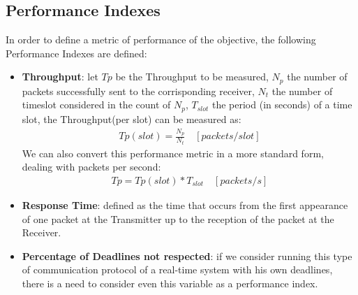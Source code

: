 \subsection{Performance Indexes}
In order to define a metric of performance of the objective, the following Performance Indexes are defined:
\begin{itemize}
	\item \textbf{Throughput}: let $Tp$ be the Throughput to be measured, $N_{p}$ the number of packets successfully sent to the corrisponding receiver, $N_{t}$ the number of timeslot considered in the count of $N_{p}$, $T_{slot}$ the period (in seconds) of a time slot, the Throughput(per slot) can be measured as:
	\begin{align*}
	Tp(slot) = \frac{N_{p}}{N_{t}} \quad [packets/slot]
	\end{align*}
	We can also convert this performance metric in a more standard form, dealing with packets per second:
	\begin{align*}
	Tp = Tp(slot) * T_{slot} \quad [packets/s]
	\end{align*}
	
	
	\item \textbf{Response Time}: defined as the time that occurs from the first appearance of one packet at the Transmitter up to the reception of the packet at the Receiver.
	
	\item \textbf{Percentage of Deadlines not respected}: if we consider running this type of communication protocol of a real-time system with his own deadlines, there is a need to consider even this variable as a performance index.
\end{itemize}